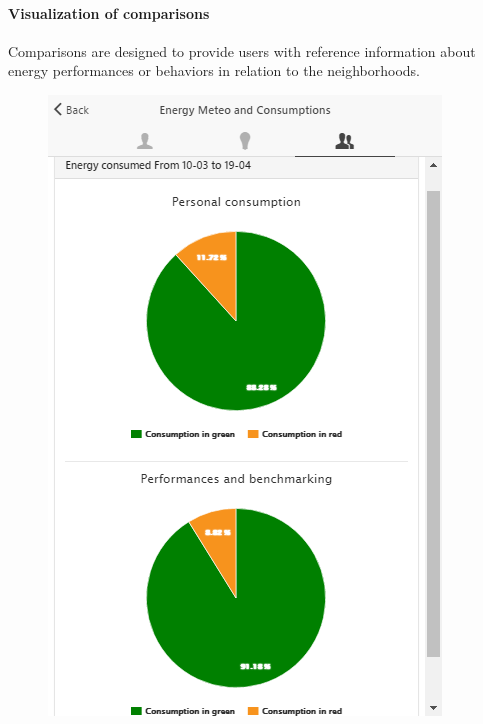 \paragraph{Visualization of comparisons} 
Comparisons are designed to provide users with reference information about energy performances or behaviors in relation to the neighborhoods.
\begin{figure}
      \begin{center}
        \begin{minipage}[htb]{0.45\linewidth}    
         \includegraphics[width=1\linewidth]{img/touperformancechart_indivcoll.png}
        \end{minipage}
 	\hfill 
         \begin{minipage}[htb]{0.45\linewidth}    

\end{minipage}
\end{center}
\end{figure}
